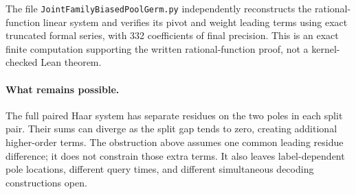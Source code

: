 The file \texttt{JointFamilyBiasedPoolGerm.py} independently reconstructs
the rational-function linear system and verifies its pivot and weight
leading terms using exact truncated formal series, with 332 coefficients
of final precision.  This is an exact finite computation supporting the
written rational-function proof, not a kernel-checked Lean theorem.

\paragraph{What remains possible.}
The full paired Haar system has separate residues on the two poles in
each split pair.  Their sums can diverge as the split gap tends to zero,
creating additional higher-order terms.  The obstruction above assumes
one common leading residue difference; it does not constrain those
extra terms.  It also leaves label-dependent pole locations, different
query times, and different simultaneous decoding constructions open.

